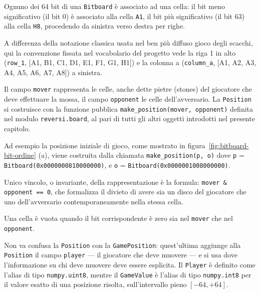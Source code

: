 Ognuno dei 64 bit di una \texttt{Bitboard} è associato ad una cella: il bit meno significativo (il bit 0) è associato
alla cella \texttt{A1}, il bit più significativo (il bit 63) alla cella \texttt{H8}, procedendo da sinistra verso
destra per righe.

A differenza della notazione classica usata nel ben più diffuso gioco degli scacchi, qui la convenzione fissata
nel vocabolario del progetto vede la riga 1 in alto (\texttt{row\_1}, [A1, B1, C1, D1, E1, F1, G1, H1]) e la colonna a
(\texttt{column\_a}, [A1, A2, A3, A4, A5, A6, A7, A8]) a sinistra.

Il campo \texttt{mover} rappresenta le celle, anche dette pietre (stones) del giocatore che deve effettuare la mossa,
il campo \texttt{opponent} le celle dell'avversario. La \texttt{Position} si costruisce con la funzione pubblica
\texttt{make\_position(mover, opponent)} definita nel modulo \texttt{reversi.board}, al pari di tutti gli altri
oggetti introdotti nel presente capitolo.

Ad esempio la posizione iniziale di gioco, come mostrato in figura~\ref{fig:bitboard-bit-ordine} (a),
viene costruita dalla chiamata \texttt{make\_position(p, o)} dove \texttt{p} = \texttt{Bitboard(0x0000000810000000)},
e \texttt{o} = \texttt{Bitboard(0x0000001008000000)}.

Unico vincolo, o invariante, della rappresentazione è la formula: \texttt{mover \& opponent == 0},
che formalizza il divieto di avere sia un disco del giocatore che uno dell'avversario contemporaneamente nella stessa
cella.

Una cella è vuota quando il bit corrispondente è zero sia nel \texttt{mover} che nel \texttt{opponent}.

Non va confusa la \texttt{Position} con la \texttt{GamePosition}: quest'ultima aggiunge alla \texttt{Position} il
campo \texttt{player} — il giocatore che deve muovere — e si usa dove l'informazione su chi deve muovere deve essere
esplicita. Il \texttt{Player} è definito come l'alias di tipo \texttt{numpy.uint8}, mentre il \texttt{GameValue} è
l'alias di tipo \texttt{numpy.int8} per il valore esatto di una posizione risolta, sull'intervallo pieno
$[-64, +64]$.

